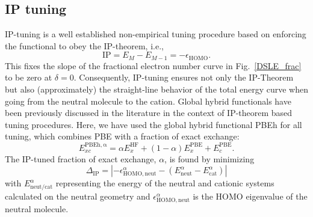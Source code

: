\documentclass[journal=jctcce,manuscript=article,layout=twocolumn]{achemso}
\begin{document}
\subsection*{IP tuning}
IP-tuning is a well established non-empirical tuning procedure based on enforcing 
the functional to obey the IP-theorem,\cite{IPtuning_JACS2009,jcp_2009_ct_excit_tuning, ann_rev_phys_chem_2010_tuning_RSH, pccp_2009_tuning_proc_paper} i.e.,
\begin{equation} \label{eq:ip_theorem}
\mathrm{IP}=E_M - E_{M-1}=-\epsilon_{\mathrm{HOMO}}.
\end{equation}
This fixes the slope of the fractional electron number curve in Fig.~\ref{DSLE_frac} to be zero at $\delta=0$. Consequently, IP-tuning ensures not only the IP-Theorem but also (approximately) the straight-line behavior of the total energy curve when going from the neutral molecule to the cation.
Global hybrid functionals have been previously discussed in the literature in the context of IP-theorem based tuning procedures.\cite{IMAMURA2011130,PhysRevLett.106.226403} 
Here, we have used the global hybrid functional PBEh for all tuning, which combines PBE with a fraction of exact exchange:
\begin{equation} \label{eq:pbeh}
 E_{xc}^{\mathrm{PBEh,\alpha}}= \alpha E_x^{\mathrm{HF}} + (1-\alpha) E_x^{\mathrm{PBE}} + E_c^{\mathrm{PBE}}.
\end{equation}
The IP-tuned fraction of exact exchange, $\alpha$, is found by minimizing 
\begin{equation} \label{eq:ip_tuning}
\Delta_{\mathrm{IP}} = |-\epsilon^{\alpha}_{\mathrm{HOMO,neut}}-(E^{\alpha}_{\mathrm{neut}}-E^{\alpha}_{\mathrm{cat}})|
\end{equation}
with $E^{\alpha}_{\mathrm{neut/cat}}$ representing the energy of the neutral and cationic systems calculated on the neutral geometry and $\epsilon^{\alpha}_{\mathrm{HOMO,neut}}$ is
the HOMO eigenvalue of the neutral molecule.
\end{document}
